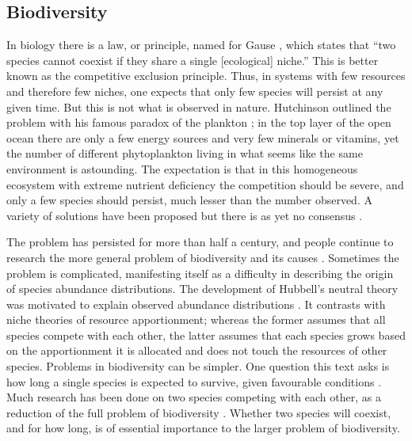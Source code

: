\documentclass[a4paper,11pt]{article}
\numberwithin{equation}{section} %
\begin{document}
\subsection{Biodiversity}
In biology there is a law, or principle, named for Gause \cite{Gause1934}, which states that ``two species cannot coexist if they share a single [ecological] niche.'' 
This is better known as the competitive exclusion principle. %
Thus, in systems with few resources and therefore few niches, one expects that only few species will persist at any given time. 
But this is not what is observed in nature. 
Hutchinson outlined the problem with his famous paradox of the plankton \cite{Hutchinson1961}; %
in the top layer of the open ocean there are only a few energy sources and very few minerals or vitamins, yet the number of different phytoplankton living in what seems like the same environment is astounding. 
The expectation is that in this homogeneous ecosystem with extreme nutrient deficiency the competition should be severe, and only a few species should persist, much lesser than the number observed. 
A variety of solutions have been proposed but there is as yet no consensus \cite{Roy2007}. 

The problem has persisted for more than half a century, and people continue to research the more general problem of biodiversity and its causes \cite{May1999,Chesson2000,Pennisi2005,Kelly2008}. 
Sometimes the problem is complicated, manifesting itself as a difficulty in describing the origin of species abundance distributions. 
The development of Hubbell's neutral theory was motivated to explain observed abundance distributions \cite{Hubbell2001}. 
It contrasts with niche theories of resource apportionment; whereas the former assumes that all species compete with each other, the latter assumes that each species grows based on the apportionment it is allocated and does not touch the resources of other species. 
Problems in biodiversity can be simpler. 
One question this text asks is how long a single species is expected to survive, given favourable conditions \cite{Badali2}. 
Much research has been done on two species competing with each other, as a reduction of the full problem of biodiversity \cite{many}. 
Whether two species will coexist, and for how long, is of essential importance to the larger problem of biodiversity. 
\end{document}
